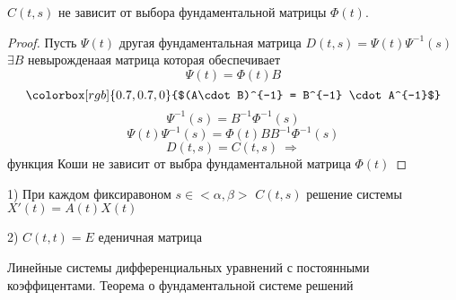 \begin{theorem}
  $C(t,s)$ не зависит от выбора фундаментальной матрицы $\Phi(t)$.
\end{theorem}

\begin{proof}
  Пусть $\Psi(t)$ другая фундаментальная матрица $D(t,s) = \Psi(t)\Psi^{-1}(s)$
  $\exists B$ невырожденаая матрица которая обеспечивает
  $$
  \Psi(t) = \Phi(t)B
  $$
  $$
  \colorbox[rgb]{0.7,0.7,0}{$(A\cdot B)^{-1} = B^{-1} \cdot A^{-1}$}
  $$
  $$
  \Psi^{-1}(s) = B^{-1} \Phi^{-1}(s)
  $$
  $$
  \Psi(t) \Psi^{-1}(s) = \Phi(t) B B^{-1} \Phi^{-1}(s)
  $$
  $$
  D(t, s) = C(t, s) ~ \Rightarrow
  $$
  функция Коши не зависит от выбра фундаментальной матрица $\Phi(t)$
\end{proof}

\begin{block}[Свойства]
  1) При каждом фиксиравоном $s \in <\alpha, \beta>$ $C(t, s)$ решение системы
  $X'(t) = A(t)X(t)$

  2) $C(t,t) = E$ еденичная матрица
\end{block}

\begin{title}[\Large]
  Линейные системы дифференциальных уравнений с постоянными коэффицентами.
  Теорема о фундаментальной системе решений
\end{title}

